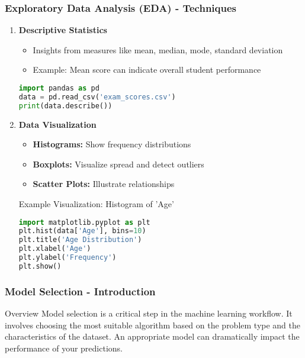 \documentclass[aspectratio=169]{beamer}
\begin{document}
\begin{frame}[fragile]
    \frametitle{Exploratory Data Analysis (EDA) - Techniques}
    \begin{enumerate}
        \item \textbf{Descriptive Statistics}
        \begin{itemize}
            \item Insights from measures like mean, median, mode, standard deviation
            \item Example: Mean score can indicate overall student performance
        \end{itemize}
        \begin{lstlisting}[language=Python]
import pandas as pd
data = pd.read_csv('exam_scores.csv')
print(data.describe())
        \end{lstlisting}
        
        \item \textbf{Data Visualization}
        \begin{itemize}
            \item \textbf{Histograms:} Show frequency distributions
            \item \textbf{Boxplots:} Visualize spread and detect outliers
            \item \textbf{Scatter Plots:} Illustrate relationships
        \end{itemize}
        Example Visualization: Histogram of 'Age'
        
        \begin{lstlisting}[language=Python]
import matplotlib.pyplot as plt
plt.hist(data['Age'], bins=10)
plt.title('Age Distribution')
plt.xlabel('Age')
plt.ylabel('Frequency')
plt.show()
        \end{lstlisting}
    \end{enumerate}
\end{frame}

\begin{frame}[fragile]
    \frametitle{Model Selection - Introduction}
    \begin{block}{Overview}
        Model selection is a critical step in the machine learning workflow. 
        It involves choosing the most suitable algorithm based on the problem type and the characteristics of the dataset.
        An appropriate model can dramatically impact the performance of your predictions.
    \end{block}
\end{frame}
\end{document}
